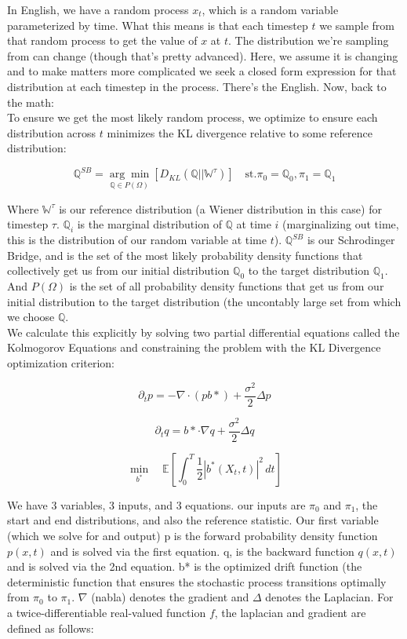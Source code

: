\documentclass[12pt]{article}
\begin{document}
In English, we have a random process \(x_t\), which is a random variable parameterized by time. What this means is that each timestep \(t\) we sample from that random process to get the value of \(x\) at \(t\). The distribution we're sampling from can change (though that's pretty advanced). Here, we assume it is changing and to make matters more complicated we seek a closed form expression for that distribution at each timestep in the process. There's the English. Now, back to the math: \\

To ensure we get the most likely random process, we optimize to ensure each distribution across \(t\) minimizes the KL divergence relative to some reference distribution: 

\[\mathbb{Q}^{SB} = \underset{\mathbb{Q} \in P(\Omega)}{\arg\min}\left[D_{KL}(\mathbb{Q}||\mathbb{W}^{\tau})\right]\quad \text{st.} \pi_0 =\mathbb{Q}_0, \pi_1 = \mathbb{Q}_1\]

Where \(\mathbb{W}^{\tau}\) is our reference distribution (a Wiener distribution in this case) for timestep \(\tau\). \(\mathbb{Q}_i\) is the marginal distribution of \(\mathbb{Q}\) at time \(i\) (marginalizing out time, this is the distribution of our random variable at time \(t\)).   \(\mathbb{Q}^{SB}\) is our Schrodinger Bridge, and is the set of the most likely probability density functions that collectively get us from our initial distribution \(\mathbb{Q}_0\) to the target distribution \(\mathbb{Q}_1\). And \(P(\Omega)\) is the set of all probability density functions that get us from our initial distribution to the target distribution (the uncontably large set from which we choose \(\mathbb{Q}\).\\

We calculate this explicitly by solving two partial differential equations called the Kolmogorov Equations and constraining the problem with the KL Divergence optimization criterion:

\[\partial_tp = -\nabla \cdot (pb*) + \frac{\sigma^2}{2}\Delta p\]

\[\partial_tq = b* \cdot \nabla q +\frac{\sigma^2}{2}\Delta q\]

\[\underset{b^*}{\min}\quad \mathbb{E}\left[\int_0^T \frac{1}{2}|b^*(X_t, t)|^2\, dt\right]\]



We have 3 variables, 3 inputs, and 3 equations. our inputs are \(\pi_0\) and \(\pi_1\), the start and end distributions, and also the reference statistic. Our first variable (which we solve for and output) p is the forward probability density function \(p(x,t)\) and is solved via the first equation. q, is the backward function \(q(x,t)\) and is solved via the 2nd equation. b* is the optimized drift function (the deterministic function that ensures the stochastic process transitions optimally from \(\pi_0\) to \(\pi_1\). \(\nabla\) (nabla) denotes the gradient and \(\Delta\) denotes the Laplacian. For a twice-differentiable real-valued function \(f\), the laplacian and gradient are defined as follows:
\end{document}

